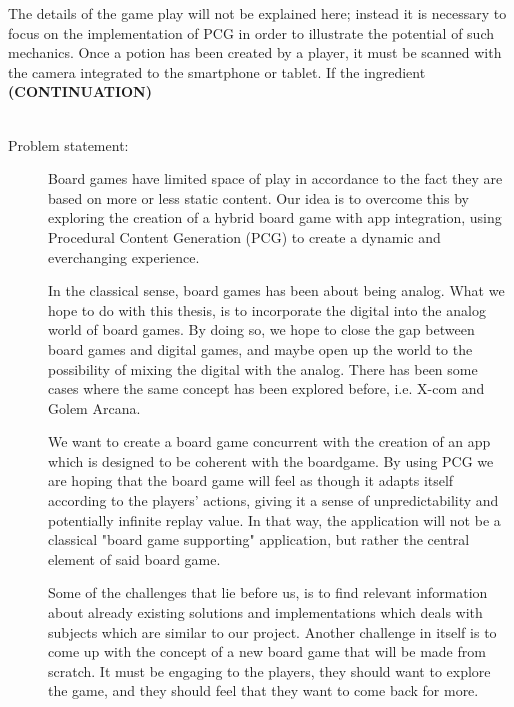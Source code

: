 The details of the game play will not be explained here; instead it is necessary to focus on the implementation of PCG in order to illustrate the potential of such mechanics. Once a potion has been created by a player, it must be scanned with the camera integrated to the smartphone or tablet. If the ingredient \textbf{(CONTINUATION)}\\\\
\begin{description}
\item[Problem statement:]
Board games have limited space of play in accordance to the fact they are based on more or less static content. Our idea is to overcome this by exploring the creation of a hybrid board game  with app integration, using Procedural Content Generation (PCG) to create a dynamic and everchanging experience.

In the classical sense, board games has been about being analog. What we hope to do with this thesis, is to incorporate the digital into the analog world of board games. By doing so, we hope to close the gap between board games and digital games, and maybe open up the world to the possibility of mixing the digital with the analog. There has been some cases where the same concept has been explored before, i.e. X-com and Golem Arcana.

We want to create a board game concurrent with the creation of an app which is designed to be coherent with the boardgame. By using PCG we are hoping that the board game will feel as though it adapts itself according to the players' actions, giving it a sense of unpredictability and potentially infinite replay value. In that way, the application will not be a classical "board game supporting" application, but rather the central element of said board game.

Some of the challenges that lie before us, is to find relevant information about already existing solutions and implementations which deals with subjects which are similar to our project.
Another challenge in itself is to come up with the concept of a new board game that will be made from scratch. It must be engaging to the players, they should want to explore the game, and they should feel that they want to come back for more.

\end{description}


